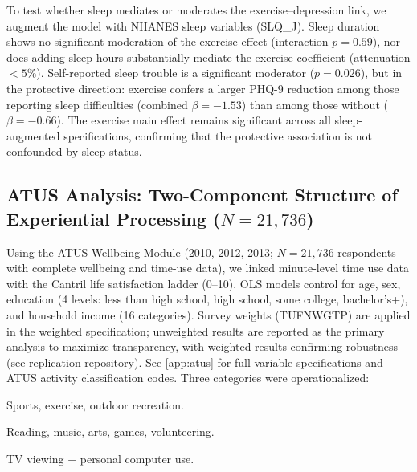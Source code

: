 \documentclass[a4paper,11pt,titlepage]{article}
\begin{document}
To test whether sleep mediates or moderates the exercise--depression link, we augment the model with NHANES sleep variables (SLQ\_J). Sleep duration shows no significant moderation of the exercise effect (interaction $p = 0.59$), nor does adding sleep hours substantially mediate the exercise coefficient (attenuation $< 5\%$). Self-reported sleep trouble is a significant moderator ($p = 0.026$), but in the protective direction: exercise confers a larger PHQ-9 reduction among those reporting sleep difficulties (combined $\beta = -1.53$) than among those without ($\beta = -0.66$). The exercise main effect remains significant across all sleep-augmented specifications, confirming that the protective association is not confounded by sleep status.


\subsection{\texorpdfstring{ATUS Analysis: Two-Component Structure of Experiential Processing ($N=21{,}736$)}{ATUS Analysis: Two-Component Structure of Experiential Processing (N=21,736)}}\label{sec:atus}

Using the ATUS Wellbeing Module (2010, 2012, 2013; $N = 21{,}736$ respondents with complete wellbeing and time-use data), we linked minute-level time use data with the Cantril life satisfaction ladder (0--10). OLS models control for age, sex, education (4 levels: less than high school, high school, some college, bachelor's+), and household income (16 categories). Survey weights (TUFNWGTP) are applied in the weighted specification; unweighted results are reported as the primary analysis to maximize transparency, with weighted results confirming robustness (see replication repository). See \cref{app:atus} for full variable specifications and ATUS activity classification codes. Three categories were operationalized:

\begin{description}[leftmargin=2em]
\item[Physical exercise (minutes/day):] Sports, exercise, outdoor recreation.
\item[Active cognitive leisure (minutes/day):] Reading, music, arts, games, volunteering.
\item[Passive leisure (minutes/day):] TV viewing + personal computer use.
\end{description}
\end{document}
